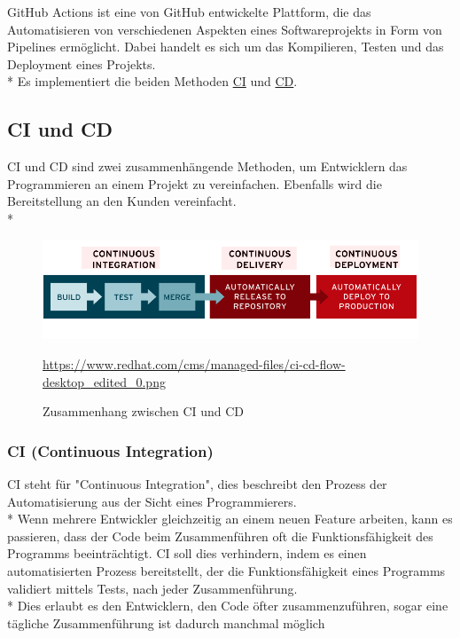 GitHub Actions ist eine von GitHub entwickelte Plattform, die das Automatisieren von verschiedenen Aspekten eines Softwareprojekts in Form von Pipelines ermöglicht.
Dabei handelt es sich um das Kompilieren, Testen und das Deployment eines Projekts. \\*
Es implementiert die beiden Methoden \hyperref[sec:CI]{CI} und \hyperref[sec:CD]{CD}. \cite{GHAction}

\subsection{CI und CD}
CI und CD sind zwei zusammenhängende Methoden, um Entwicklern das Programmieren an einem Projekt zu vereinfachen. Ebenfalls wird die Bereitstellung 
an den Kunden vereinfacht. \\*

\begin{figure}[htp]
    \centering
    \author{RedHat}
    \includegraphics[scale=0.5]{pics/ci_cdi_grafik.png}
    \caption{Zusammenhang zwischen CI und CD}
    \small \url{https://www.redhat.com/cms/managed-files/ci-cd-flow-desktop_edited_0.png} 
    \label{fig:impl:CICD}
\end{figure}

\subsubsection{CI (Continuous Integration)}
\label{sec:CI}
CI steht für "Continuous Integration", dies beschreibt den Prozess der Automatisierung aus der Sicht eines Programmierers. \\*
Wenn mehrere Entwickler gleichzeitig an einem neuen Feature arbeiten, kann es passieren, dass der Code beim Zusammenführen oft die Funktionsfähigkeit des Programms beeinträchtigt.
CI soll dies verhindern, indem es einen automatisierten Prozess bereitstellt, der die Funktionsfähigkeit eines Programms validiert mittels Tests, nach jeder Zusammenführung.\\* Dies erlaubt 
es den Entwicklern, den Code öfter zusammenzuführen, sogar eine tägliche Zusammenführung ist dadurch manchmal möglich \cite{RHatCICD}

